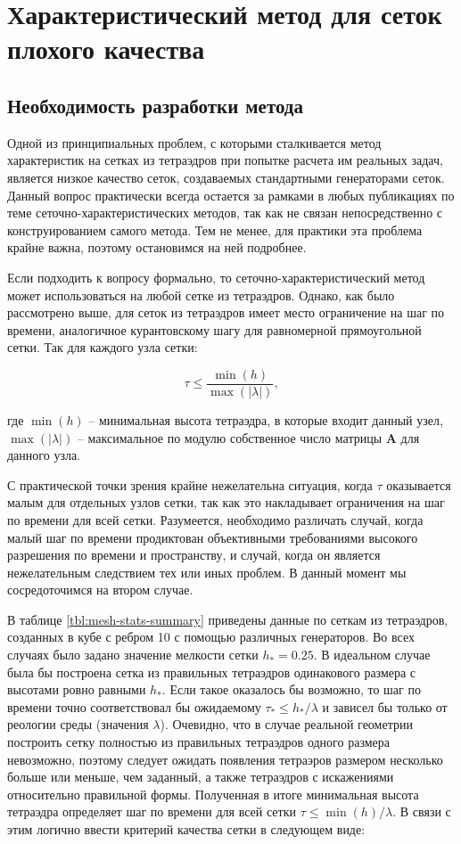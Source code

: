\section{Характеристический метод для сеток плохого качества}

\subsection{Необходимость разработки метода}

Одной из принципиальных проблем, с которыми сталкивается метод характеристик на сетках из тетраэдров при попытке расчета им реальных задач, является низкое качество сеток, создаваемых стандартными генераторами сеток. Данный вопрос практически всегда остается за рамками в любых публикациях по теме сеточно-характеристических методов, так как не связан непосредственно с конструированием самого метода. Тем не менее, для практики эта проблема крайне важна, поэтому остановимся на ней подробнее.

Если подходить к вопросу формально, то сеточно-характеристический метод может использоваться на любой сетке из тетраэдров. Однако, как было рассмотрено выше, для сеток из тетраэдров имеет место ограничение на шаг по времени, аналогичное курантовскому шагу для равномерной прямоугольной сетки. Так для каждого узла сетки:

\begin{equation}
\tau \le \frac{\min(h)}{\max(|\lambda|)},
\end{equation}

где $\min(h)$ -- минимальная высота тетраэдра, в которые входит данный узел, $\max(|\lambda|)$ -- максимальное по модулю собственное число матрицы $\mathbf A$ для данного узла.

С практической точки зрения крайне нежелательна ситуация, когда $\tau$ оказывается малым для отдельных узлов сетки, так как это накладывает ограничения на шаг по времени для всей сетки. Разумеется, необходимо различать случай, когда малый шаг по времени продиктован объективными требованиями высокого разрешения по времени и пространству, и случай, когда он является нежелательным следствием тех или иных проблем. В данный момент мы сосредоточимся на втором случае.

В таблице \ref{tbl:mesh-stats-summary} приведены данные по сеткам из тетраэдров, созданных в кубе с ребром 10 с помощью различных генераторов. Во всех случаях было задано значение мелкости сетки $h_* = 0.25$. В идеальном случае была бы построена сетка из правильных тетраэдров одинакового размера с высотами ровно равными $h_*$. Если такое оказалось бы возможно, то шаг по времени точно соответствовал бы ожидаемому $\tau_* \le h_* / \lambda$ и зависел бы только от реологии среды (значения $\lambda$). Очевидно, что в случае реальной геометрии построить сетку полностью из правильных тетраэдров одного размера невозможно, поэтому следует ожидать появления тетраэров размером несколько больше или меньше, чем заданный, а также тетраэдров с искажениями относительно правильной формы. Полученная в итоге минимальная высота тетраэдра определяет шаг по времени для всей сетки $\tau \le \min(h) / \lambda$. В связи с этим логично ввести критерий качества сетки в следующем виде:

